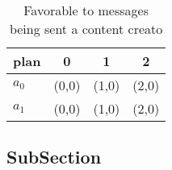 \documentclass[a4paper]{article}
\begin{document}
\begin{table}
\begin{adjustbox}{width=0.6\columnwidth}
\begin{tabular}{|l|l|l|l|}
\hline
\textbf{plan} & \multicolumn{1}{c|}{\textbf{0}} & \multicolumn{1}{c|}{\textbf{1}} & \multicolumn{1}{c|}{\textbf{2}} \\ \hline
\textbf{$a_0$}  & (0,0) & (1,0) & (2,0) \\ \hline
\textbf{$a_1$}  & (0,0) & (1,0) & (2,0) \\ \hline
\end{tabular}
\end{adjustbox}
\caption{Favorable to messages being sent a content creato
}
\end{table}

\subsection{SubSection}
\end{document}
